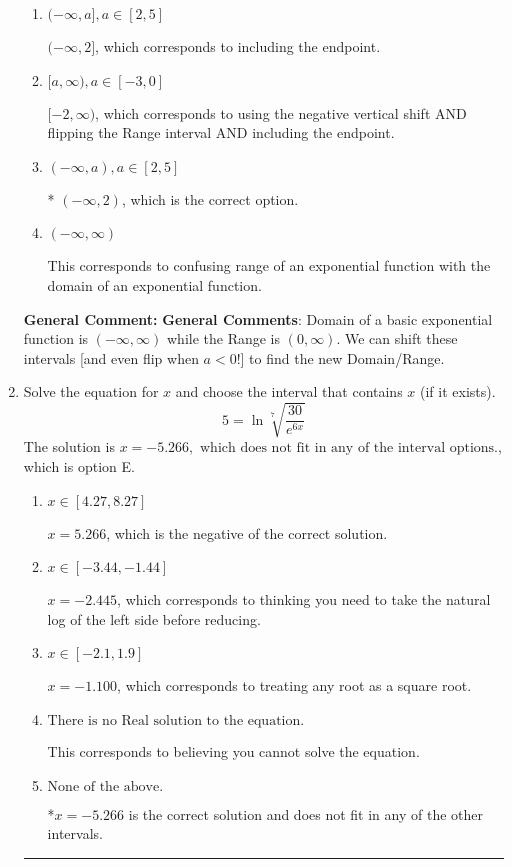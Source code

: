 \documentclass{extbook}[14pt]
\newcommand{\litem}[1]{\item #1

\rule{\textwidth}{0.4pt}}
\begin{document}
\begin{enumerate}
{\begin{enumerate}[label=\Alph*.]
$(-2, \infty)$, which corresponds to using the negative vertical shift AND flipping the Range interval.
\item \( (-\infty, a], a \in [2, 5] \)

$(-\infty, 2]$, which corresponds to including the endpoint.
\item \( [a, \infty), a \in [-3, 0] \)

$[-2, \infty)$, which corresponds to using the negative vertical shift AND flipping the Range interval AND including the endpoint.
\item \( (-\infty, a), a \in [2, 5] \)

* $(-\infty, 2)$, which is the correct option.
\item \( (-\infty, \infty) \)

This corresponds to confusing range of an exponential function with the domain of an exponential function.
\end{enumerate}

\textbf{General Comment:} \textbf{General Comments}: Domain of a basic exponential function is $(-\infty, \infty)$ while the Range is $(0, \infty)$. We can shift these intervals [and even flip when $a<0$!] to find the new Domain/Range.
}
\litem{
 Solve the equation for $x$ and choose the interval that contains $x$ (if it exists).
\[  5 = \ln{\sqrt[7]{\frac{30}{e^{6x}}}} \]The solution is \( x = -5.266, \text{ which does not fit in any of the interval options.} \), which is option E.\begin{enumerate}[label=\Alph*.]
\item \( x \in [4.27, 8.27] \)

$x = 5.266$, which is the negative of the correct solution.
\item \( x \in [-3.44, -1.44] \)

$x = -2.445$, which corresponds to thinking you need to take the natural log of the left side before reducing.
\item \( x \in [-2.1, 1.9] \)

$x = -1.100$, which corresponds to treating any root as a square root.
\item \( \text{There is no Real solution to the equation.} \)

This corresponds to believing you cannot solve the equation.
\item \( \text{None of the above.} \)

*$x = -5.266$ is the correct solution and does not fit in any of the other intervals.
\end{enumerate}

}
\end{enumerate}
\end{document}
